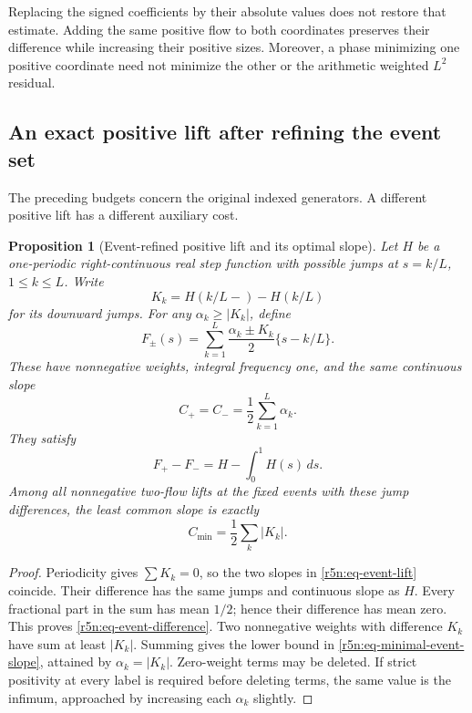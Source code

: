 \documentclass[11pt,a4paper]{article}
\newtheorem{proposition}[theorem]{Proposition}
\theoremstyle{definition}\newtheorem{definition}[theorem]{Definition}
\theoremstyle{remark}\newtheorem{remark}[theorem]{Remark}
\numberwithin{equation}{section}
\begin{document}
Replacing the signed coefficients by their absolute values does
not restore that estimate. Adding the same positive flow to both
coordinates preserves their difference while increasing their
positive sizes. Moreover, a phase minimizing one positive
coordinate need not minimize the other or the arithmetic weighted
\(L^2\) residual.

\subsection{An exact positive lift after refining the event set}
\label{r5n:subsec-event-lift}

The preceding budgets concern the original indexed generators.
A different positive lift has a different auxiliary cost.

\begin{proposition}[Event-refined positive lift and its optimal slope]
\label{r5n:prop-event-lift}
Let \(H\) be a one-periodic right-continuous real step function with possible jumps
at \(s=k/L\), \(1\le k\le L\). Write
\[
 K_k=H(k/L-)-H(k/L)
\]
for its downward jumps. For any \(\alpha_k\ge|K_k|\), define
\begin{equation}
\label{r5n:eq-event-lift}
 F_\pm(s)=\sum_{k=1}^L
        \frac{\alpha_k\pm K_k}{2}\{s-k/L\}.
\end{equation}
These have nonnegative weights, integral frequency one, and the
same continuous slope
\[
 C_+=C_-=\frac12\sum_{k=1}^L\alpha_k.
\]
They satisfy
\begin{equation}
\label{r5n:eq-event-difference}
 F_+-F_-=H-\int_0^1H(s)\,ds.
\end{equation}
Among all nonnegative two-flow lifts at the fixed events with
these jump differences, the least common slope is exactly
\begin{equation}
\label{r5n:eq-minimal-event-slope}
 C_{\min}=\frac12\sum_k|K_k|.
\end{equation}
\end{proposition}

\begin{proof}
Periodicity gives \(\sum K_k=0\), so the two slopes in
\eqref{r5n:eq-event-lift} coincide. Their difference has the same
jumps and continuous slope as \(H\). Every fractional part in
the sum has mean \(1/2\); hence their difference has mean zero.
This proves \eqref{r5n:eq-event-difference}.
Two nonnegative weights with difference \(K_k\) have sum at least
\(|K_k|\). Summing gives the lower bound in
\eqref{r5n:eq-minimal-event-slope}, attained by
\(\alpha_k=|K_k|\).
Zero-weight terms may be deleted. If strict positivity at every
label is required before deleting terms, the same value is the
infimum, approached by increasing each \(\alpha_k\) slightly.
\end{proof}
\end{document}
